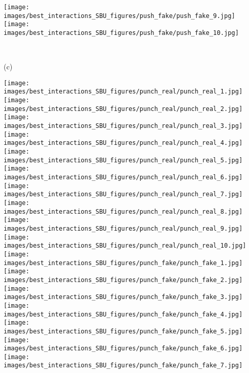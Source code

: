 \documentclass[times,twocolumn,final]{elsarticle}
\begin{document}
\begin{figure*}
\begin{minipage}{0.9\textwidth}
  \hfill
  \texttt{[image: images/best\_interactions\_SBU\_figures/push\_fake/push\_fake\_9.jpg]}
  \hfill
  \texttt{[image: images/best\_interactions\_SBU\_figures/push\_fake/push\_fake\_10.jpg]}
  \hfill
    \end{minipage}\\
    \begin{minipage}{0.08\textwidth}
       (c)\quad{}%
    \end{minipage}
    \begin{minipage}{0.9\textwidth}
  \texttt{[image: images/best\_interactions\_SBU\_figures/punch\_real/punch\_real\_1.jpg]}
  \hfill
  \texttt{[image: images/best\_interactions\_SBU\_figures/punch\_real/punch\_real\_2.jpg]}
  \hfill
  \texttt{[image: images/best\_interactions\_SBU\_figures/punch\_real/punch\_real\_3.jpg]}
  \hfill
  \texttt{[image: images/best\_interactions\_SBU\_figures/punch\_real/punch\_real\_4.jpg]}
  \hfill
  \texttt{[image: images/best\_interactions\_SBU\_figures/punch\_real/punch\_real\_5.jpg]}
  \hfill
  \texttt{[image: images/best\_interactions\_SBU\_figures/punch\_real/punch\_real\_6.jpg]}
  \hfill
  \texttt{[image: images/best\_interactions\_SBU\_figures/punch\_real/punch\_real\_7.jpg]}
  \hfill
  \texttt{[image: images/best\_interactions\_SBU\_figures/punch\_real/punch\_real\_8.jpg]}
  \hfill
  \texttt{[image: images/best\_interactions\_SBU\_figures/punch\_real/punch\_real\_9.jpg]}
  \hfill
  \texttt{[image: images/best\_interactions\_SBU\_figures/punch\_real/punch\_real\_10.jpg]}
  \hfill \\
  \texttt{[image: images/best\_interactions\_SBU\_figures/punch\_fake/punch\_fake\_1.jpg]}
  \hfill
  \texttt{[image: images/best\_interactions\_SBU\_figures/punch\_fake/punch\_fake\_2.jpg]}
  \hfill
  \texttt{[image: images/best\_interactions\_SBU\_figures/punch\_fake/punch\_fake\_3.jpg]}
  \hfill
  \texttt{[image: images/best\_interactions\_SBU\_figures/punch\_fake/punch\_fake\_4.jpg]}
  \hfill
  \texttt{[image: images/best\_interactions\_SBU\_figures/punch\_fake/punch\_fake\_5.jpg]}
  \hfill
  \texttt{[image: images/best\_interactions\_SBU\_figures/punch\_fake/punch\_fake\_6.jpg]}
  \hfill
  \texttt{[image: images/best\_interactions\_SBU\_figures/punch\_fake/punch\_fake\_7.jpg]}

\end{minipage}
\end{figure*}
\end{document}
